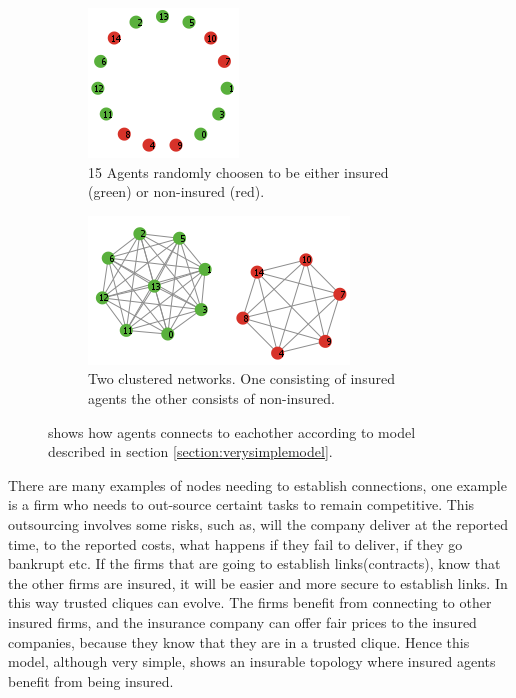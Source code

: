 \begin{figure}[h]
\centering
\begin{subfigure}{.5\textwidth}
  \centering
  \includegraphics[width=0.4\linewidth]{../Figures/firstModelWithNoParameters1.png}
  \caption{\label{fig:firstmod1} 15 Agents randomly choosen to be either insured (green) or non-insured (red).}
\end{subfigure}
\quad
\begin{subfigure}{.46\textwidth}
  \centering
  \includegraphics[width=0.8\linewidth]{../Figures/firstModelWithNoParameters2.png}
  \caption{\label{fig:firstmod2} Two clustered networks. One consisting of insured agents the other consists of non-insured.}
\end{subfigure}
\caption{\label{fig:fincont} shows how agents connects to eachother according to model described in section \ref{section:verysimplemodel}.}
\end{figure}


There are many examples of nodes needing to establish connections, one example is a firm who needs to out-source certaint tasks to remain competitive. This outsourcing involves some risks, such as, will the company deliver at the reported time, to the reported costs, what happens if they fail to deliver, if they go bankrupt etc. If the firms that are going to establish links(contracts), know that the other firms are insured, it will be easier and more secure to establish links. In this way trusted cliques can evolve. The firms benefit from connecting to other insured firms, and the insurance company can offer fair prices to the insured companies, because they know that they are in a trusted clique.
Hence this model, although very simple, shows an insurable topology where insured agents benefit from being insured. 


